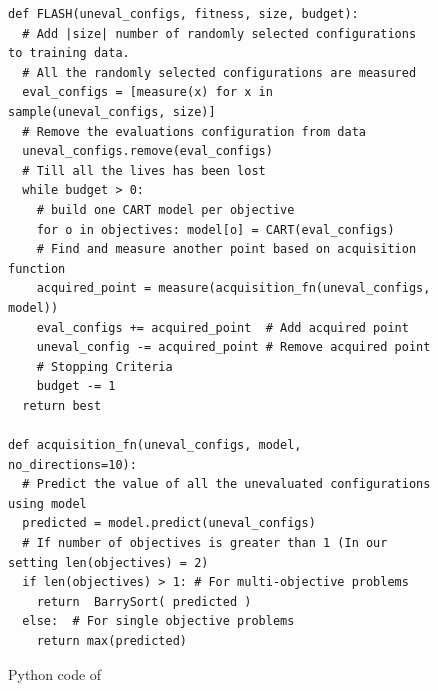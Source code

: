 \begin{figure}
\small
\hspace{0.2cm}\begin{lstlisting}[xrightmargin=5.0ex,mathescape,frame=none,numbers=right]
def FLASH(uneval_configs, fitness, size, budget):
  # Add |size| number of randomly selected configurations to training data. 
  # All the randomly selected configurations are measured
  eval_configs = [measure(x) for x in sample(uneval_configs, size)]
  # Remove the evaluations configuration from data
  uneval_configs.remove(eval_configs)
  # Till all the lives has been lost
  while budget > 0:
    # build one CART model per objective
    for o in objectives: model[o] = CART(eval_configs)
    # Find and measure another point based on acquisition function
    acquired_point = measure(acquisition_fn(uneval_configs, model))
    eval_configs += acquired_point  # Add acquired point 
    uneval_config -= acquired_point # Remove acquired point 
    # Stopping Criteria
    budget -= 1
  return best
  
def acquisition_fn(uneval_configs, model, no_directions=10):  
  # Predict the value of all the unevaluated configurations using model
  predicted = model.predict(uneval_configs)
  # If number of objectives is greater than 1 (In our setting len(objectives) = 2)
  if len(objectives) > 1: # For multi-objective problems
    return  BarrySort( predicted )
  else:  # For single objective problems
    return max(predicted)  
\end{lstlisting}
\caption{Python code of \flash}
\label{fig:flash_frame}  
\end{figure}


